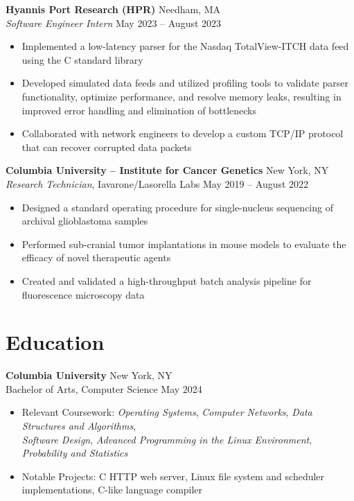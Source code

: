 \documentclass[11pt,a4paper]{article}   %
\begin{document}
\textbf{Hyannis Port Research (HPR)} \hfill Needham, MA\\
\textit{Software Engineer Intern} \hfill May 2023 – August 2023
\begin{itemize}[noitemsep, topsep=2pt, partopsep=0pt, parsep=0pt]
  \item Implemented a low-latency parser for the Nasdaq TotalView-ITCH data feed using the C standard library
  \item Developed simulated data feeds and utilized profiling tools to validate parser functionality, optimize
        performance, and resolve memory leaks, resulting in improved error handling and elimination of bottlenecks
  \item Collaborated with network engineers to develop a custom TCP/IP protocol that can recover corrupted data packets
\end{itemize}
\vspace{0.2cm}

\textbf{Columbia University – Institute for Cancer Genetics} \hfill New York, NY\\
\textit{Research Technician}, Iavarone/Lasorella Labs \hfill May 2019 – August 2022 
\begin{itemize}[noitemsep, topsep=2pt, partopsep=0pt, parsep=0pt]
  \item Designed a standard operating procedure for single-nucleus sequencing of archival glioblastoma samples 
  \item Performed sub-cranial tumor implantations in mouse models to evaluate the efficacy of novel therapeutic agents
  \item Created and validated a high-throughput batch analysis pipeline for fluorescence microscopy data
\end{itemize}

\section*{Education}
\textbf{Columbia University} \hfill New York, NY\\
Bachelor of Arts, Computer Science \hfill May 2024

\begin{itemize}
  \item Relevant Coursework: 
    \textit{Operating Systems}, \textit{Computer Networks}, \textit{Data Structures and Algorithms},\\
    \textit{Software Design}, \textit{Advanced Programming in the Linux Environment}, \textit{Probability and Statistics}
  \item Notable Projects: C HTTP web server, Linux file system and scheduler implementations, C-like language compiler
\end{itemize}
\end{document}
